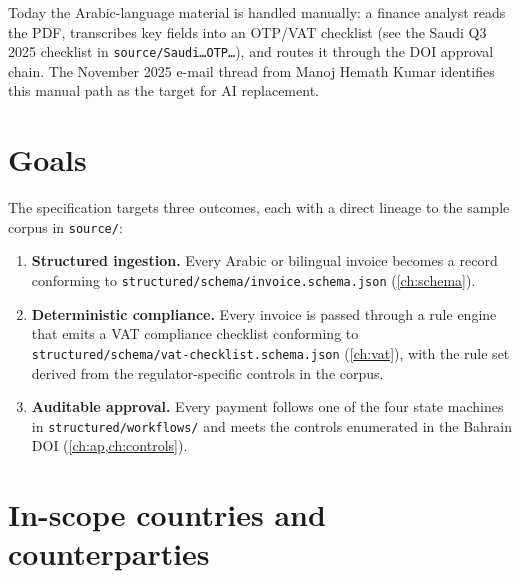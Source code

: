 \documentclass[11pt,a4paper,twoside]{report}
\newcommand{\corpus}{}
\begin{document}
Today the Arabic-language material is handled manually: a finance analyst
reads the PDF, transcribes key fields into an OTP/VAT checklist (see the
Saudi Q3 2025 checklist in \corpus\texttt{source/Saudi\ldots OTP\ldots}),
and routes it through the DOI approval chain. The November 2025 e-mail
thread from Manoj Hemath Kumar identifies this manual path as the target
for AI replacement.

\section{Goals}

The specification targets three outcomes, each with a direct lineage to
the sample corpus in \corpus\texttt{source/}:

\begin{enumerate}
\item \textbf{Structured ingestion.} Every Arabic or bilingual invoice
becomes a record conforming to
\texttt{structured/schema/invoice.schema.json}
(\cref{ch:schema}).
\item \textbf{Deterministic compliance.} Every invoice is passed
through a rule engine that emits a VAT compliance checklist
conforming to \texttt{structured/schema/vat-checklist.schema.json}
(\cref{ch:vat}), with the rule set derived from the
regulator-specific controls in the corpus.
\item \textbf{Auditable approval.} Every payment follows one of the
four state machines in \corpus\texttt{structured/workflows/} and
meets the controls enumerated in the Bahrain DOI
(\cref{ch:ap,ch:controls}).
\end{enumerate}

\section{In-scope countries and counterparties}
\end{document}
